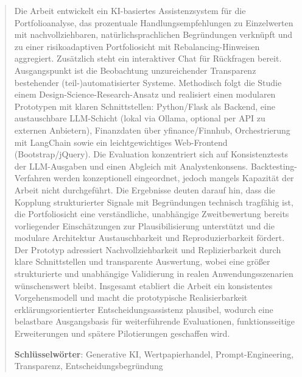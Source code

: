 
\pagestyle{empty}

\renewcommand{\abstractname}{Kurzfassung}

\begin{abstract}

    Die Arbeit entwickelt ein KI-basiertes Assistenzsystem für die Portfolioanalyse, das prozentuale Handlungsempfehlungen zu Einzelwerten mit nachvollziehbaren, natürlichsprachlichen Begründungen verknüpft und zu einer risikoadaptiven Portfoliosicht mit Rebalancing-Hinweisen aggregiert.
    Zusätzlich steht ein interaktiver Chat für Rückfragen bereit.
    Ausgangspunkt ist die Beobachtung unzureichender Transparenz bestehender (teil-)automatisierter Systeme.
    Methodisch folgt die Studie einem Design-Science-Research-Ansatz und realisiert einen modularen Prototypen mit klaren Schnittstellen: Python/Flask als Backend, eine austauschbare LLM-Schicht (lokal via Ollama, optional per API zu externen Anbietern), Finanzdaten über yfinance/Finnhub, Orchestrierung mit LangChain sowie ein leichtgewichtiges Web-Frontend (Bootstrap/jQuery).
    Die Evaluation konzentriert sich auf Konsistenztests der LLM-Ausgaben und einen Abgleich mit Analystenkonsens.
    Backtesting-Verfahren werden konzeptionell eingeordnet, jedoch mangels Kapazität der Arbeit nicht durchgeführt.
    Die Ergebnisse deuten darauf hin, dass die Kopplung strukturierter Signale mit Begründungen technisch tragfähig ist, die Portfoliosicht eine verständliche, unabhängige Zweitbewertung bereits vorliegender Einschätzungen zur Plausibilisierung unterstützt und die modulare Architektur Austauschbarkeit und Reproduzierbarkeit fördert.
    Der Prototyp adressiert Nachvollziehbarkeit und Replizierbarkeit durch klare Schnittstellen und transparente Auswertung, wobei eine größer strukturierte und unabhängige Validierung in realen Anwendungsszenarien wünschenswert bleibt.
    Insgesamt etabliert die Arbeit ein konsistentes Vorgehensmodell und macht die prototypische Realisierbarkeit erklärungsorientierter Entscheidungsassistenz plausibel, wodurch eine belastbare Ausgangsbasis für weiterführende Evaluationen, funktionsseitige Erweiterungen und spätere Pilotierungen geschaffen wird.

    \textbf{Schlüsselwörter}: Generative KI, Wertpapierhandel, Prompt-Engineering, Transparenz, Entscheidungsbegründung

\end{abstract}


\renewcommand{\abstractname}{Abstract} %

